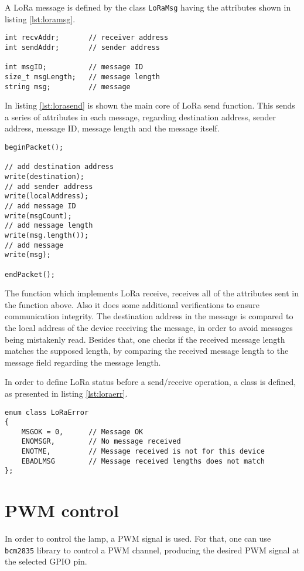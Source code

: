 A LoRa message is defined by the class \verb|LoRaMsg| having the attributes shown in listing \ref{lst:loramsg}.

\begin{lstlisting}[caption={LoRa message.}, label={lst:loramsg}]
int recvAddr;     	// receiver address
int sendAddr;     	// sender address

int msgID;        	// message ID
size_t msgLength; 	// message length
string msg;       	// message
\end{lstlisting}

In listing \ref{lst:lorasend} is shown the main core of LoRa send function. This sends a series of attributes in each message, regarding destination address, sender address, message ID, message length and the message itself.

\begin{lstlisting}[caption={LoRa send function.}, label={lst:lorasend}]
beginPacket();

// add destination address  
write(destination);
// add sender address
write(localAddress);
// add message ID
write(msgCount);
// add message length
write(msg.length());
// add message
write(msg);

endPacket();
\end{lstlisting}

The function which implements LoRa receive, receives all of the attributes sent in the function above. Also it does some additional verifications to ensure communication integrity. The destination address in the message is compared to the local address of the device receiving the message, in order to avoid messages being mistakenly read. Besides that, one checks if the received message length matches the supposed length, by comparing the received message length to the message field regarding the message length.

In order to define LoRa status before a send/receive operation, a class is defined, as presented in listing \ref{lst:loraerr}.
 
\begin{lstlisting}[caption={LoRaError enum class.}, label={lst:loraerr}]
enum class LoRaError
{
	MSGOK = 0,  	// Message OK
	ENOMSGR,    	// No message received
	ENOTME,     	// Message received is not for this device
	EBADLMSG    	// Message received lengths does not match
};
\end{lstlisting}

\clearpage
\section{PWM control}
In order to control the lamp, a PWM signal is used. For that, one can use \verb|bcm2835| library to control a PWM channel, producing the desired PWM signal at the selected GPIO pin. \cite{bcmpwm}

